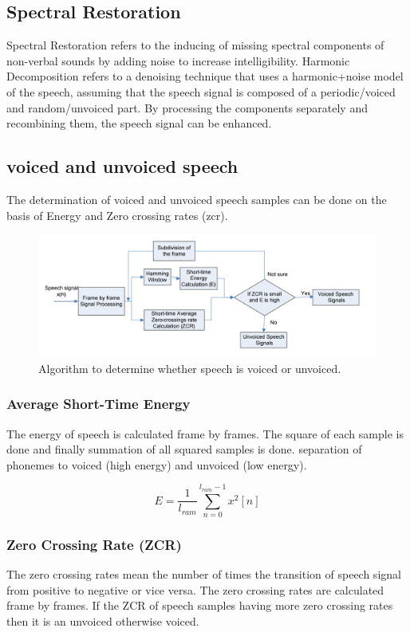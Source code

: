 \documentclass[12pt, a4paper, twoside]{report}
\begin{document}
\subsection{Spectral Restoration}
Spectral Restoration refers to the inducing of missing spectral components of non-verbal sounds by adding noise to increase intelligibility. Harmonic Decomposition refers to a denoising technique that uses a harmonic+noise model of the speech, assuming that the speech signal is composed of a periodic/voiced and random/unvoiced part. By processing the components separately and recombining them, the speech signal can be enhanced.

\subsection{voiced and unvoiced speech}
The determination of voiced and unvoiced speech samples can be done on the basis of Energy and Zero crossing rates (\acrshort{zcr}).

\begin{figure}[ht]
	\centering
	\includegraphics[width=1\textwidth]
	{images/chapter2/algorithm-voiced-unvoiced}
	\caption{Algorithm to determine whether speech is voiced or unvoiced.}
	\label{fig:algorithm-voiced-unvoiced}
\end{figure}

\subsubsection{Average Short-Time Energy}
 The energy of speech is calculated frame by frames. The square of each sample is done and finally summation of all squared samples is done. separation of phonemes to voiced (high energy) and unvoiced (low energy).

\begin{equation*}
E = \frac{1}{l_{ram}} \sum_{n=0}^{l_{ram} - 1} x^2 [n]
\end{equation*}

\subsubsection{Zero Crossing Rate (ZCR)}
The zero crossing rates mean the number of times the transition of speech signal from positive to negative or vice versa. The zero crossing rates are calculated frame by frames. If the ZCR of speech samples having more zero crossing rates then it is an unvoiced otherwise voiced.
\end{document}
